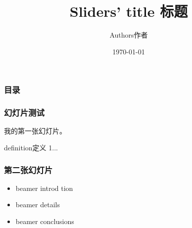 \documentclass[12pt]{beamer}
\title{Sliders' title 标题}
\author{Authors作者}
\date{\today}
\begin{document}
\begin{CJK}{UTF8}{gbsn}     %
    \begin{frame} %
        \titlepage   
    \end{frame}
    \begin{frame}
        \frametitle{目录}
        \tableofcontents
    \end{frame}
    \begin{frame}
        \frametitle{幻灯片测试}
        \pause
        我的第一张幻灯片。
        \begin{definition}
            definition定义 1...
        \end{definition}
    \end{frame}
    \begin{frame}
        \frametitle{第二张幻灯片}\pause
        \begin{itemize}
         \item beamer introd tion \pause
         \item beamer details \pause
         \item beamer conclusions
        \end{itemize}
    \end{frame}
\end{CJK}
\end{document}
